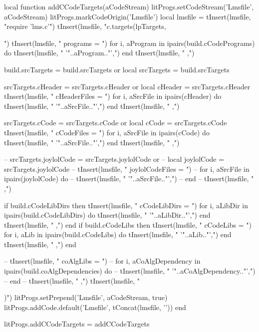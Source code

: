 local function addCCodeTargets(aCodeStream)
  litProgs.setCodeStream('Lmsfile', aCodeStream)
  litProgs.markCodeOrigin('Lmsfile')
  local lmsfile = {}
  tInsert(lmsfile, "require 'lms.c'\n")
  tInsert(lmsfile, "c.targets(lpTargets, {")
  tInsert(lmsfile, "  programs = {")
  for i, aProgram in ipairs(build.cCodePrograms) do
    tInsert(lmsfile, "    '"..aProgram.."',")
  end
  tInsert(lmsfile, "  },")
  
  build.srcTargets = build.srcTargets or { }
  local srcTargets = build.srcTargets
  
  srcTargets.cHeader = srcTargets.cHeader or { }
  local cHeader      = srcTargets.cHeader
  tInsert(lmsfile, "  cHeaderFiles = {")
  for i, aSrcFile in ipairs(cHeader) do
    tInsert(lmsfile, "    '"..aSrcFile.."',")
  end
  tInsert(lmsfile, "  },")
  
  srcTargets.cCode = srcTargets.cCode or { }
  local cCode      = srcTargets.cCode
  tInsert(lmsfile, "  cCodeFiles = {")
  for i, aSrcFile in ipairs(cCode) do
    tInsert(lmsfile, "    '"..aSrcFile.."',")
  end
  tInsert(lmsfile, "  },")

--  srcTargets.joylolCode = srcTargets.joylolCode or { }
--  local joylolCode      = srcTargets.joylolCode
--  tInsert(lmsfile, "  joylolCodeFiles = {")
--  for i, aSrcFile in ipairs(joylolCode) do
--    tInsert(lmsfile, "    '"..aSrcFile.."',")
--  end
--  tInsert(lmsfile, "  },")

  if build.cCodeLibDirs then 
    tInsert(lmsfile, "  cCodeLibDirs = {")
    for i, aLibDir in ipairs(build.cCodeLibDirs) do
      tInsert(lmsfile, "    '"..aLibDir.."',")
    end
    tInsert(lmsfile, "  },")
  end
  if build.cCodeLibs then 
    tInsert(lmsfile, "  cCodeLibs = {")
    for i, aLib in ipairs(build.cCodeLibs) do
      tInsert(lmsfile, "    '"..aLib.."',")
    end
    tInsert(lmsfile, "  },")
  end

--  tInsert(lmsfile, "  coAlgLibs = {")
--  for i, aCoAlgDependency in ipairs(build.coAlgDependencies) do
--    tInsert(lmsfile, "    '"..aCoAlgDependency.."',")
--  end
--  tInsert(lmsfile, "  },")
  tInsert(lmsfile, "})")
  litProgs.setPrepend('Lmsfile', aCodeStream, true)
  litProgs.addCode.default('Lmsfile', tConcat(lmsfile, '\n'))
end

litProgs.addCCodeTargets = addCCodeTargets
\stopLuaCode

\startMkIVCode
\def\compileLmsfile#1{
  \directlua{
    thirddata.literateProgs.compileLmsfile('#1')
  }
}
\stopMkIVCode

